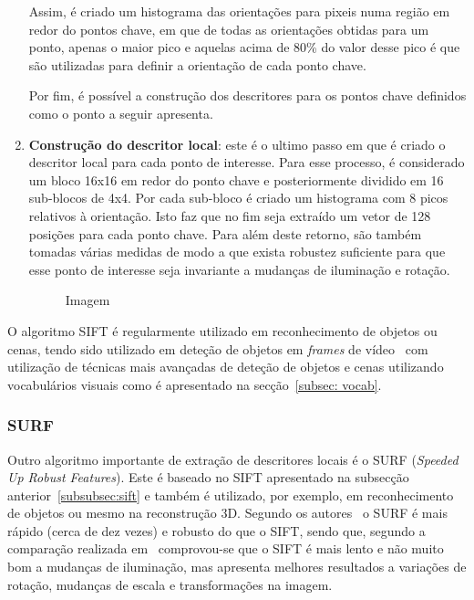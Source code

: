 \begin{enumerate}
Assim, é criado um histograma das orientações para pixeis numa região em redor do pontos chave, em que de todas as orientações obtidas para um ponto, apenas o maior pico e aquelas acima de 80\% do valor desse pico é que são utilizadas para definir a orientação de cada ponto chave.

Por fim, é possível a construção dos descritores para os pontos chave definidos como o ponto a seguir apresenta.

\item \textbf{Construção do descritor local}: este é o ultimo passo em que é criado o descritor local para cada ponto de interesse. Para esse processo, é considerado um bloco 16x16 em redor do ponto chave e posteriormente dividido em 16 sub-blocos de 4x4. Por cada sub-bloco é criado um histograma com 8 picos relativos à orientação. Isto faz que no fim seja extraído um vetor de 128 posições para cada ponto chave. Para além deste retorno, são também tomadas várias medidas de modo a que exista robustez suficiente para que esse ponto de interesse seja invariante a mudanças de iluminação e rotação. 

\begin{figure}
\centering
\caption{Imagem}
\end{figure}
 
\end{enumerate}

O algoritmo SIFT é regularmente utilizado em reconhecimento de objetos ou cenas, tendo sido utilizado em deteção de objetos em \textit{frames} de vídeo~\cite{Sivic2003, Sivic2006} com utilização de técnicas mais avançadas de deteção de objetos e cenas utilizando vocabulários visuais como é apresentado na secção~\ref{subsec: vocab}.

\subsubsection{SURF} \label{subsubsec:surf}

Outro algoritmo importante de extração de descritores locais é o SURF (\textit{Speeded Up Robust Features}). Este é baseado no SIFT apresentado na subsecção anterior~\ref{subsubsec:sift} e também é utilizado, por exemplo, em reconhecimento de objetos ou mesmo na reconstrução 3D. Segundo os autores~\cite{Bay2006} o SURF é mais rápido (cerca de dez vezes) e robusto do que o SIFT, sendo que, segundo a comparação realizada em~\cite{Juan2009} comprovou-se que o SIFT é mais lento e não muito bom a mudanças de iluminação, mas apresenta melhores resultados a variações de rotação, mudanças de escala e transformações na imagem.


